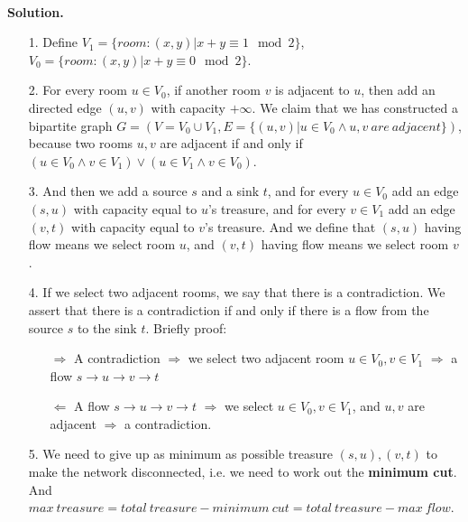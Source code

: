 \documentclass{article}
\begin{document}
\begin{enumerate}
~\\
\textbf{Solution.}\\
\begin{itemize}
    \item [1.] Define $V_1 = \{room: (x,y)|x + y \equiv 1 \mod 2\}$, $V_0=\{room:(x,y)|x+y\equiv 0 \mod 2\}$.
    \item [2.] For every room $u\in V_0$, if another room $v$ is adjacent to $u$, then add an directed edge $(u,v)$ with capacity $+\infty$. We claim that we has constructed a bipartite graph $G=(V=V_0\cup V_1,E=\{(u,v)|u\in V_0\wedge u,v\ are\ adjacent\})$, because two rooms $u, v$ are adjacent if and only if $(u
\in V_0\wedge v\in V_1) \vee (u\in V_1 \wedge v\in V_0)$.
    \item [3.] And then we add a source $s$ and a sink $t$, and for every $u\in V_0$ add an edge $(s, u)$ with capacity equal to $u$'s treasure, and for every $v\in V_1$ add an edge $(v, t)$ with capacity equal to $v$'s treasure. And we define that $(s,u)$ having flow means we select room $u$, and $(v,t)$ having flow means we select room $v$.
    \item [4.] If we select two adjacent rooms, we say that there is a contradiction. We assert that there is a contradiction if and only if there is a flow from the source $s$ to the sink $t$. Briefly proof: \begin{itemize}
            \item [$\Rightarrow$] A contradiction $\Rightarrow$ we select two adjacent room $u\in V_0, v\in V_1$ $\Rightarrow$ a flow $s\rightarrow u \rightarrow v \rightarrow t$
            \item [$\Leftarrow$]  A flow $s\rightarrow u\rightarrow v\rightarrow t$ $\Rightarrow$ we select $u\in V_0, v\in V_1$, and $u,v$ are adjacent $\Rightarrow$ a contradiction. 
            \end{itemize}
    \item [5.] We need to give up as minimum as possible treasure $(s,u), (v,t)$ to make the network disconnected, i.e. we need to work out the \textbf{minimum cut}. And $max\ treasure = total\ treasure - minimum\ cut = total\ treasure - max\ flow$.
\end{itemize}
\begin{figure}[htb]
\centering
\begin{minipage}[H]{0.25\linewidth}
    \centering

\end{minipage}
\end{figure}
\end{enumerate}
\end{document}
